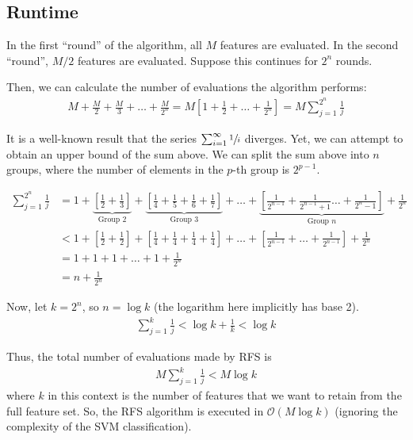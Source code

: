 \documentclass[12pt, twoside, a4paper]{report}
\begin{document}
\subsection{Runtime}
In the first ``round'' of the algorithm, all $M$ features are evaluated. In the second ``round'', $M/2$ features are evaluated. Suppose this continues for $2^n$ rounds.

Then, we can calculate the number of evaluations the algorithm performs:
\begin{align*}
M+\frac{M}{2}+\frac{M}{3}+\dots+\frac{M}{2^n} = M\left[ 1+\frac{1}{2}+\dots+\frac{1}{2^n} \right]=M \sum_{j=1}^{2^n} \frac{1}{j}
\end{align*}

It is a well-known result that the series $\sum_{i=1}^{\infty} \sfrac{1}{i}$ diverges. Yet, we can attempt to obtain an upper bound of the sum above. We can split the sum above into $n$ groups, where the number of elements in the $p$-th group is $2^{p-1}$.

\begin{align*}
\sum_{j=1}^{2^n} \frac{1}{j}
&= 1 + \underbrace{\left[ \frac{1}{2} + \frac{1}{3} \right]}_{\text{Group 2}} + \underbrace{\left[ \frac{1}{4} + \frac{1}{5} + \frac{1}{6} + \frac{1}{7} \right]}_{\text{Group 3}} + \dots + \underbrace{\left[ \frac{1}{2^{n-1}} + \frac{1}{2^{n-1}+1} \dots + \frac{1}{2^{n}-1} \right]}_{\text{Group $n$}} + \frac{1}{2^n} \\
&< 1 + \left[ \frac{1}{2} + \frac{1}{2} \right] + \left[ \frac{1}{4} + \frac{1}{4} + \frac{1}{4} + \frac{1}{4} \right] + \dots + \left[ \frac{1}{2^{n-1}} + \dots + \frac{1}{2^{n-1}} \right] + \frac{1}{2^n} \\
&= 1+1+1+ \dots + 1 + \frac{1}{2^n} \\
&= n + \frac{1}{2^n}
\end{align*}

Now, let $k=2^n$, so $n=\log k$ (the logarithm here implicitly has base 2).
\begin{align*}
\sum_{j=1}^k \frac{1}{j} < \log k+ \frac{1}{k} < \log k
\end{align*}

Thus, the total number of evaluations made by RFS is
\begin{align*}
M \sum_{j=1}^k \frac{1}{j} < M \log k
\end{align*}
where $k$ in this context is the number of features that we want to retain from the full feature set. So, the RFS algorithm is executed in $\mathcal{O}(M\log k)$ (ignoring the complexity of the SVM classification).
\end{document}

